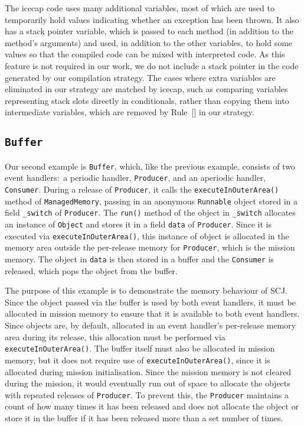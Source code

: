 The icecap code uses many additional variables, most of which are used
to temporarily hold values indicating whether an exception has been
thrown.
It also has a stack pointer variable, which is passed to each method
(in addition to the method's arguments) and used, in addition to the
other variables, to hold some values so that the compiled code can be
mixed with interpreted code.
As this feature is not required in our work, we do not include a stack
pointer in the code generated by our compilation strategy.
The cases where extra variables are eliminated in our strategy are
matched by icecap, such as comparing variables representing stack
slots directly in conditionals, rather than copying them into
intermediate variables, which are removed by
Rule~[] in our
strategy.

\subsection{\texorpdfstring{\texttt{Buffer}}{Buffer}}

Our second example is \texttt{Buffer}, which, like the previous
example, consists of two event handlers:~a periodic handler,
\texttt{Producer}, and an aperiodic handler, \texttt{Consumer}.
During a release of \texttt{Producer}, it calls the
\texttt{executeInOuterArea()} method of \texttt{ManagedMemory},
passing in an anonymous \texttt{Runnable} object stored in a field
\texttt{\_switch} of \texttt{Producer}.
The \texttt{run()} method of the object in \texttt{\_switch} allocates
an instance of \texttt{Object} and stores it in a field \texttt{data}
of \texttt{Producer}.
Since it is executed via \texttt{executeInOuterArea()}, this instance
of object is allocated in the memory area outside the per-release
memory for \texttt{Producer}, which is the mission memory.
The object in \texttt{data} is then stored in a buffer and the
\texttt{Consumer} is released, which pops the object from the buffer.

The purpose of this example is to demonstrate the memory behaviour of
SCJ.
Since the object passed via the buffer is used by both event handlers,
it must be allocated in mission memory to ensure that it is available
to both event handlers.
Since objects are, by default, allocated in an event handler's
per-release memory area during its release, this allocation must be
performed via \texttt{executeInOuterArea()}.
The buffer itself must also be allocated in mission memory, but it
does not require use of \texttt{executeInOuterArea()}, since it is
allocated during mission initialisation.
Since the mission memory is not cleared during the mission, it would
eventually run out of space to allocate the objects with repeated
releases of \texttt{Producer}.
To prevent this, the \texttt{Producer} maintains a count of how many
times it has been released and does not allocate the object or store
it in the buffer if it has been released more than a set number of
times.

